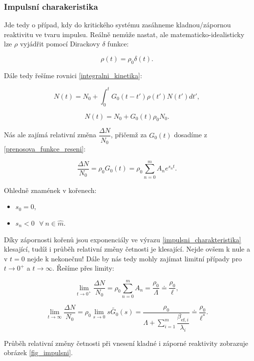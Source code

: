 \subsubsection{Impulsní charakeristika}

Jde tedy o případ, kdy do kritického systému zasáhneme kladnou/zápornou reaktivitu ve tvaru impulsu. Reálně nemůže nastat, ale matematicko-idealisticky lze $\rho$ vyjádřit pomocí Dirackovy $\delta$ funkce:

$$ \rho(t) = \rho_0 \delta (t). $$

Dále tedy řešíme rovnici \eqref{integralni_kinetika}:

$$ N(t) = N_0 + \int_0^t G_0(t-t') \rho(t') N(t')dt', $$

$$ N(t) = N_0 + G_0(t) \rho_0 N_0. $$

Nás ale zajímá relativní změna $\dfrac{\Delta N}{N_0}$, přičemž za $G_0(t)$ dosadíme z \eqref{prenosova_funkce_reseni}:

\begin{equation}
  \boxed{
  \dfrac{\Delta N}{N_0} = \rho_0 G_0 (t) = \rho_0 \sum_{n=0}^m A_n e^{s_n t}.
  \label{impulsni_charakteristika}}
\end{equation}

Ohledně znamének v kořenech:

\begin{itemize}
  \item $s_0 = 0$,
  \item $s_n < 0 \: \: \: \forall \: n \in \widehat{m}$.
\end{itemize}

Díky zápornosti kořenů jsou exponenciály ve výrazu \eqref{impulsni_charakteristika} klesající, tudíž i průběh relativní změny četnosti je klesající. Nejde ovšem k nule a v $t=0$ nejde k nekonečnu! Dále by nás tedy mohly zajímat limitní případy pro $t \rightarrow 0^+$ a $t \rightarrow \infty$. Řešíme přes limity:

$$ \lim_{t \to 0^+} \dfrac{\Delta N}{N_0} = \rho_0 \sum_{n=0}^m A_n = \dfrac{\rho_0}{\Lambda} \doteq \dfrac{\rho_0}{\ell}, $$

$$ \lim_{t \to \infty} \dfrac{\Delta N}{N_0} = \rho_0 \lim_{s \rightarrow 0} s \tilde{G_0}(s) = \dfrac{\rho_0}{\Lambda + \sum_{i = 1}^m \dfrac{\beta_{\text{ef},i}}{\lambda_i}} \doteq \dfrac{\rho_0}{\ell^*}. $$

Průběh relativní změny četnosti při vnesení kladné i záporné reaktivity zobrazuje obrázek \ref{fig_impulsni}.

